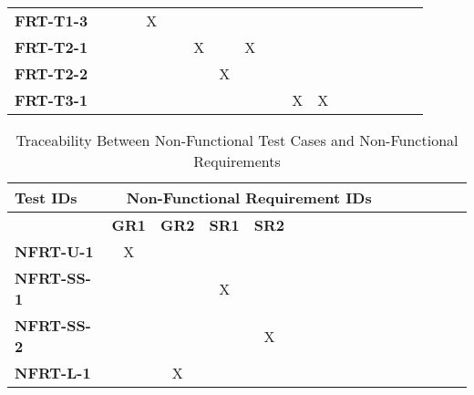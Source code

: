 \documentclass[12pt, titlepage]{article}
\begin{document}
\begin{landscape}
\begin{longtable}{|l|cccccccccccccccc|}
      	\textbf{FRT-T1-3}  & ~                                                         & ~            & X            & ~            & ~            & ~            & ~            & ~            & ~            & ~             \\
            \textbf{FRT-T2-1}  & ~                                                         & ~            & ~            & ~            & X            & ~            & X            & ~            & ~            & ~             \\
            \textbf{FRT-T2-2}  & ~                                                         & ~            & ~            & ~            & ~            & X            & ~            & ~            & ~            & ~             \\
            \textbf{FRT-T3-1}  & ~                                                         & ~            & ~            & ~            & ~            & ~            & ~            & ~            & X            & X             \\     
			\hline
		\end{longtable}

		\begin{longtable}{|l|cccccccccccccccc|}
			\caption{Traceability Between Non-Functional Test Cases and Non-Functional Requirements}                                                                                                                                                                                                                           \\
			\hline
			\textbf{Test IDs}   & \multicolumn{11}{c|}{\textbf{Non-Functional Requirement IDs}}                                                                                                                                                                                                                                         \\
			\hline
			~                   & \textbf{GR1}                                              & \textbf{GR2} & \textbf{SR1} & \textbf{SR2} \\
			\hline
			\textbf{NFRT-U-1}  & X                                                         & ~            & ~            & ~             \\
			\textbf{NFRT-SS-1}  & ~                                                         & ~            & X            & ~            \\
			\textbf{NFRT-SS-2}  & ~                                                         & ~            & ~            & X            \\
			\textbf{NFRT-L-1}  & ~                                                         & X            & ~            & ~             \\
			\hline
		\end{longtable}
\end{landscape}
\end{document}
